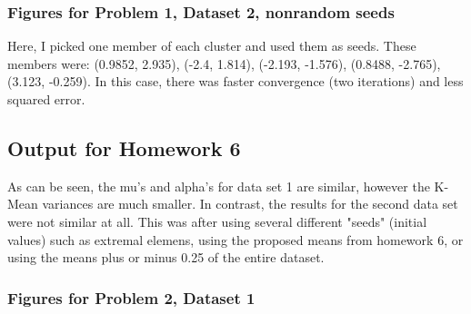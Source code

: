 \documentclass[12pt]{article}
\begin{document}
	\subsubsection*{Figures for Problem 1, Dataset 2, nonrandom seeds}
	Here, I picked one member of each cluster and used them as seeds. These members were: (0.9852, 2.935), (-2.4, 1.814), (-2.193, -1.576), (0.8488, -2.765), (3.123, -0.259). In this case, there was faster convergence (two iterations) and less squared error.
		\begin{center}
		\end{center}
	\subsection*{Output for Homework 6}
		\begin{center}
		\end{center}
	
	As can be seen, the mu's and alpha's for data set 1 are similar, however the K-Mean variances are much smaller. In contrast, the results for the second data set were not similar at all. This was after using several different "seeds" (initial values) such as extremal elemens, using the proposed means from homework 6, or using the means plus or minus 0.25 of the entire dataset.
	
	\subsubsection*{Figures for Problem 2, Dataset 1}
		\begin{center}
		\end{center}
		\begin{center}
		\end{center}
		\begin{center}
		\end{center}
\end{document}
